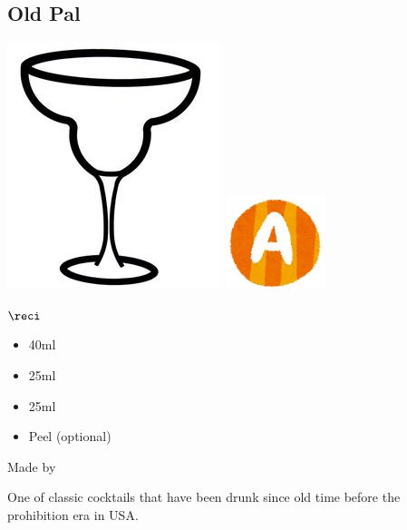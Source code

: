 \subsection{Old Pal}
\vspace{-7mm}
\hspace{28mm}
\includegraphics[scale=.05]{cocktail_glass_snow.jpg}
\includegraphics[scale=.12]{capital_a.png}
\vspace{2.5mm}
\begin{itembox}[l]{\boldmath $\reci$}
\begin{itemize}
\setlength{\parskip}{0cm}
\setlength{\itemsep}{0cm}
\item \rye 40ml
\item \vermouth 25ml
\item \campari 25ml
\item \lemon Peel (optional)
\end{itemize}
\vspace{-4mm}
Made by \stir
\end{itembox}
One of classic cocktails that have been drunk since old time before the prohibition era in USA.
